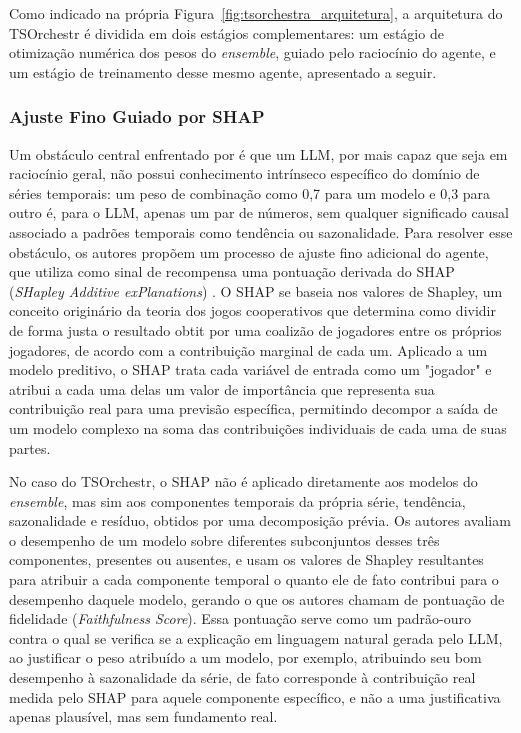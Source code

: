 Como indicado na própria Figura~\ref{fig:tsorchestra_arquitetura}, a arquitetura do TSOrchestr é dividida em dois estágios complementares: um estágio de otimização numérica dos pesos do \textit{ensemble}, guiado pelo raciocínio do agente, e um estágio de treinamento desse mesmo agente, apresentado a seguir.


\subsubsection{Ajuste Fino Guiado por SHAP}
\label{subsec:tsorchestra-shap}

Um obstáculo central enfrentado por \citet{cao2025tsorchestr} é que um LLM, por mais capaz que seja em raciocínio geral, não possui conhecimento intrínseco específico do domínio de séries temporais: um peso de combinação como 0,7 para um modelo e 0,3 para outro é, para o LLM, apenas um par de números, sem qualquer significado causal associado a padrões temporais como tendência ou sazonalidade. Para resolver esse obstáculo, os autores propõem um processo de ajuste fino adicional do agente, que utiliza como sinal de recompensa uma pontuação derivada do SHAP (\textit{SHapley Additive exPlanations}) \citep{lundberg2017shap}. O SHAP se baseia nos valores de Shapley, um conceito originário da teoria dos jogos cooperativos que determina como dividir de forma justa o resultado obtit por uma coalizão de jogadores entre os próprios jogadores, de acordo com a contribuição marginal de cada um. Aplicado a um modelo preditivo, o SHAP trata cada variável de entrada como um "jogador" e atribui a cada uma delas um valor de importância que representa sua contribuição real para uma previsão específica, permitindo decompor a saída de um modelo complexo na soma das contribuições individuais de cada uma de suas partes.

No caso do TSOrchestr, o SHAP não é aplicado diretamente aos modelos do \textit{ensemble}, mas sim aos componentes temporais da própria série, tendência, sazonalidade e resíduo, obtidos por uma decomposição prévia. Os autores avaliam o desempenho de um modelo sobre diferentes subconjuntos desses três componentes, presentes ou ausentes, e usam os valores de Shapley resultantes para atribuir a cada componente temporal o quanto ele de fato contribui para o desempenho daquele modelo, gerando o que os autores chamam de pontuação de fidelidade (\textit{Faithfulness Score}). Essa pontuação serve como um padrão-ouro contra o qual se verifica se a explicação em linguagem natural gerada pelo LLM, ao justificar o peso atribuído a um modelo, por exemplo, atribuindo seu bom desempenho à sazonalidade da série, de fato corresponde à contribuição real medida pelo SHAP para aquele componente específico, e não a uma justificativa apenas plausível, mas sem fundamento real.

